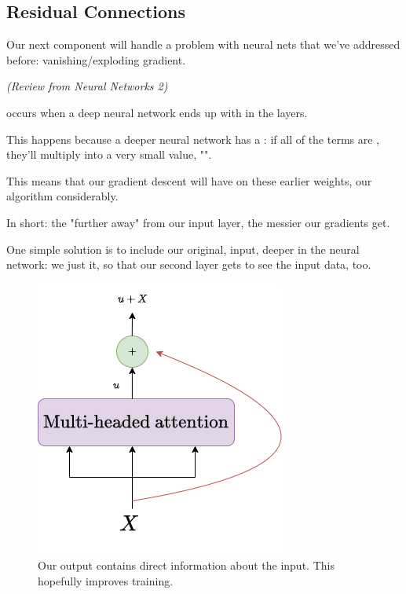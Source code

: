     \pagebreak
    

    \subsection{Residual Connections}

    
        Our next component will handle a problem with  neural nets that we've addressed before: vanishing/exploding gradient.\\

        \begin{definition}
            \textit{(Review from Neural Networks 2)}
            
             occurs when a deep neural network ends up with  in the  layers. 
            
            This happens because a deeper neural network has a : if all of the terms are , they'll multiply into a very small value, "".
            
            This means that our gradient descent will have  on these earlier weights,  our algorithm considerably.
        \end{definition}

        In short: the "further away" from our input layer, the messier our gradients get.

        One simple solution is to include our original,  input, deeper in the neural network: we just  it, so that our second layer gets to see the input data, too.

        \begin{figure}[H]
            \centering
            \includegraphics[width=0.3\linewidth]{images/transformers_images/residual_connection.png}
            \caption*{Our output contains direct information about the input. This hopefully improves training.}
        \end{figure}

